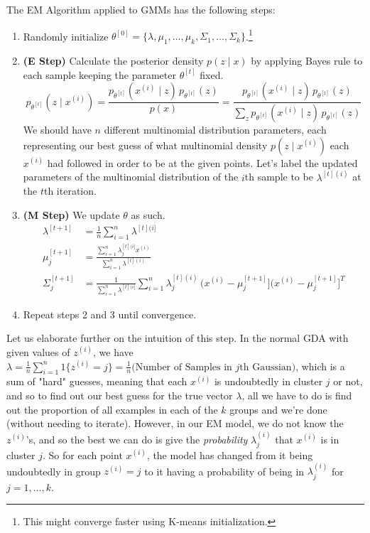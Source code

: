\documentclass{article}
\begin{document}
  \begin{algo}
    The EM Algorithm applied to GMMs has the following steps:

    \begin{enumerate}
      \item Randomly initialize $\theta^{[0]} = \{\lambda, \mu_1, \ldots, \mu_k, \Sigma_1, \ldots, \Sigma_k\}$.\footnote{This might converge faster using K-means initialization.} 

      \item \textbf{(E Step)} Calculate the posterior density $p(z \mid x)$ by applying Bayes rule to each sample keeping the parameter $\theta^{[t]}$ fixed. 
      \begin{equation}
        p_{\theta^{[t]}} (z \mid x^{(i)}) = \frac{p_{\theta^{[t]}} (x^{(i)} \mid z) \, p_{\theta^{[t]}}(z)}{p(x)} = \frac{p_{\theta^{[t]}} (x^{(i)} \mid z) \, p_{\theta^{[t]}}(z)}{\sum_z p_{\theta^{[t]}} (x^{(i)} \mid z) \, p_{\theta^{[t]}}(z)}
      \end{equation}
      We should have $n$ different multinomial distribution parameters, each representing our best guess of what multinomial density $p(z \mid x^{(i)})$ each $x^{(i)}$ had followed in order to be at the given points. Let's label the updated parameters of the multinomial distribution of the $i$th sample to be $\lambda^{[t](i)}$ at the $t$th iteration. 

      \item \textbf{(M Step)} We update $\theta$ as such. 
      \begin{align}
        \lambda^{[t+1]}  & = \frac{1}{n} \sum_{i=1}^n \lambda^{[t](i]} \\
        \mu_j^{[t+1]} & = \frac{\sum_{i=1}^n \lambda^{[t](i]}_j x^{(i)}}{\sum_{i=1}^n \lambda^{[t](i)}} \\ 
        \Sigma_j^{[t+1]} & = \frac{1}{\sum_{i=1}^n \lambda^{[t](i]}} \sum_{i=1}^n \lambda^{[t](i)}_j \,\big(x^{(i)} - \mu_j^{[t+1]} \big]\big(x^{(i)} - \mu_j^{[t+1]} \big]^T
      \end{align}

      \item Repeat steps 2 and 3 until convergence. 
    \end{enumerate}
  \end{algo}

  Let us elaborate further on the intuition of this step. In the normal GDA with given values of $z^{(i)}$, we have $\lambda= \frac{1}{n} \sum_{i=1}^n 1\{z^{(i)} = j\} = \frac{1}{n}\big(\text{Number of Samples in }j\text{th Gaussian}\big)$, which is a sum of "hard" guesses, meaning that each $x^{(i)}$ is undoubtedly in cluster $j$ or not, and so to find out our best guess for the true vector $\lambda$, all we have to do is find out the proportion of all examples in each of the $k$ groups and we're done (without needing to iterate). However, in our EM model, we do not know the $z^{(i)}$'s, and so the best we can do is give the \textit{probability} $\lambda^{(i)}_j$ that $x^{(i)}$ is in cluster $j$. So for each point $x^{(i)}$, the model has changed from it being undoubtedly in group $z^{(i)} = j$ to it having a probability of being in $\lambda^{(i)}_j$ for $j = 1, \ldots, k$.
\end{document}
